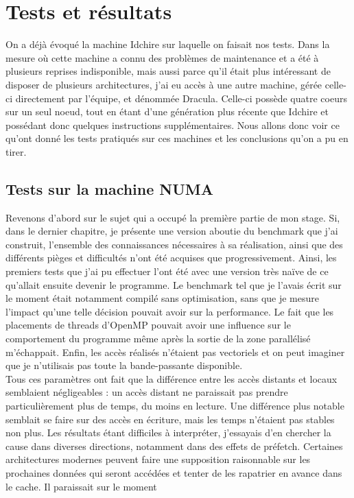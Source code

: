\documentclass{report}
\begin{document}
\section{Tests et résultats}
On a déjà évoqué la machine Idchire sur laquelle on faisait nos tests. Dans la mesure où cette machine
a connu des problèmes de maintenance et a été à plusieurs reprises indisponible, mais aussi parce qu'il
était plus intéressant de disposer de plusieurs architectures, j'ai eu accès à une autre machine, gérée
celle-ci directement par l'équipe, et dénommée Dracula. Celle-ci possède quatre coeurs sur un seul noeud,
tout en étant d'une génération plus récente que Idchire et possédant donc quelques instructions 
supplémentaires. Nous allons donc voir ce qu'ont donné les tests pratiqués sur ces machines et les
conclusions qu'on a pu en tirer.
\subsection{Tests sur la machine NUMA}
Revenons d'abord sur le sujet qui a occupé la première partie de mon stage. Si, dans le dernier chapitre,
je présente une version aboutie du benchmark que j'ai construit, l'ensemble des connaissances 
nécessaires à sa réalisation, ainsi que des différents pièges et difficultés n'ont été acquises que 
progressivement. Ainsi, les premiers tests que j'ai pu effectuer l'ont été avec une version très naïve
de ce qu'allait ensuite devenir le programme. Le benchmark tel que je l'avais écrit sur le moment 
était notamment compilé sans optimisation, sans que je mesure l'impact qu'une telle décision pouvait
avoir sur la performance. Le fait que les placements de threads d'OpenMP pouvait avoir une influence
sur le comportement du programme même après la sortie de la zone parallélisé m'échappait. Enfin, les
accès réalisés n'étaient pas vectoriels et on peut imaginer que je n'utilisais pas toute la 
bande-passante disponible.
\\Tous ces paramètres ont fait que la différence entre les accès distants et locaux semblaient 
négligeables : un accès distant ne paraissait pas prendre particulièrement plus de temps, du moins
en lecture. Une différence plus notable semblait se faire sur des accès en écriture, mais les temps
n'étaient pas stables non plus. Les résultats étant difficiles à interpréter, j'essayais d'en 
chercher la cause dans diverses directions, notamment dans des effets de préfetch. Certaines 
architectures modernes peuvent faire une supposition raisonnable sur les prochaines données qui
seront accédées et tenter de les rapatrier en avance dans le cache. Il paraissait sur le moment
\end{document}
